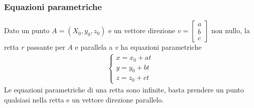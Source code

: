 \documentclass[../main.tex]{subfiles}
\begin{document}
\subsubsection{Equazioni parametriche}
Dato un punto $A = (X_0, y_0, z_0)$ e un vettore direzione $v = \begin{bmatrix}
    a \\ b \\ c
\end{bmatrix}$ non nullo, la retta $r$ passante per $A$ e parallela a $v$ ha equazioni parametriche
\begin{align*}
    \begin{cases}
        x = x_0 + at \\
        y = y_0 + bt \\
        z = z_0 + ct
    \end{cases}
\end{align*}
Le equazioni parametriche di una retta sono infinite, basta prendere un punto qualsiasi nella retta e un vettore direzione parallelo.

\vspace{1cm}
\end{document}

